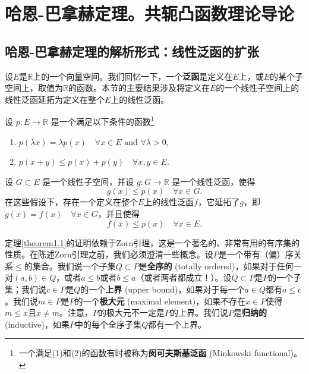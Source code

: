\chapter{哈恩-巴拿赫定理。共轭凸函数理论导论}
\section{哈恩-巴拿赫定理的解析形式：线性泛函的扩张}

设$E$是$\mathbb{R}$上的一个向量空间。我们回忆一下，一个\textbf{泛函}是定义在$E$上，或$E$的某个子空间上，取值为$\mathbb{R}$的函数。本节的主要结果涉及将定义在$E$的一个线性子空间上的线性泛函延拓为定义在整个$E$上的线性泛函。

\begin{theorem}\label{theorem1.1}
设 $p: E \to \mathbb{R}$ 是一个满足以下条件的函数\footnote{一个满足(1)和(2)的函数有时被称为\textbf{闵可夫斯基泛函} (Minkowski functional)。}
\begin{enumerate}[(1)]
\item $p(\lambda x) = \lambda p(x) \quad \forall x \in E \text{ and } \forall \lambda > 0,$
\item $p(x+y) \leq p(x) + p(y) \quad \forall x, y \in E.$
\end{enumerate}
设 $G \subset E$ 是一个线性子空间，并设 $g: G \to \mathbb{R}$ 是一个线性泛函，使得
\begin{equation}\label{eq3}
g(x) \leq p(x) \quad \forall x \in G.
\end{equation}
在这些假设下，存在一个定义在整个$E$上的线性泛函$f$，它延拓了$g$，即 $g(x) = f(x) \quad \forall x \in G$，并且使得
\begin{equation}\label{eq4}
f(x) \leq p(x) \quad \forall x \in E.
\end{equation}
\end{theorem}

定理\ref{theorem1.1}的证明依赖于Zorn引理，这是一个著名的、非常有用的有序集的性质。在陈述Zorn引理之前，我们必须澄清一些概念。设$P$是一个带有（偏）序关系$\leq$的集合。我们说一个子集$Q \subset P$是\textbf{全序的} (totally ordered)，如果对于任何一对$(a, b) \in Q$，或者$a \leq b$或者$b \leq a$（或者两者都成立！）。设$Q \subset P$是$P$的一个子集；我们说$c \in P$是$Q$的一个\textbf{上界} (upper bound)，如果对于每一个$a \in Q$都有$a \leq c$。我们说$m \in P$是$P$的一个\textbf{极大元} (maximal element)，如果不存在$x \in P$使得$m \leq x$且$x \neq m$。注意，$P$的极大元不一定是$P$的上界。我们说$P$是\textbf{归纳的} (inductive)，如果$P$中的每个全序子集$Q$都有一个上界。

